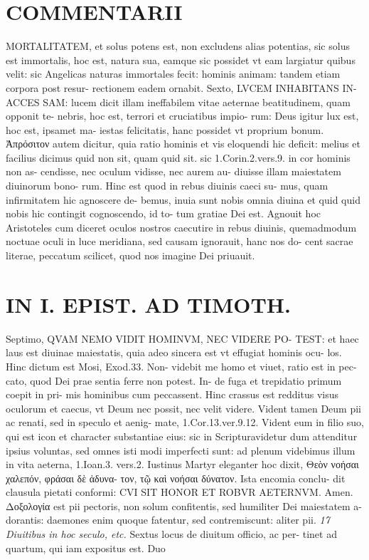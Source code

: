 \documentclass{article}
\begin{document}
\begin{pages}
\section*{COMMENTARII }
\marginpar{[ p.166 ]}\pstart MORTALITATEM, et solus potens est, non excludens alias potentias, sic solus est immortalis, hoc est, natura sua, eamque sic possidet vt eam largiatur quibus velit: sic Angelicas naturas immortales fecit: hominis animam: tandem etiam corpora post resur- rectionem eadem ornabit.  \pend\pstart Sexto, LVCEM INHABITANS IN- ACCES SAM: lucem dicit illam ineffabilem vitae aeternae beatitudinem, quam opponit te- nebris, hoc est, terrori et cruciatibus impio- rum: Deus igitur lux est, hoc est, ipsamet ma- iestas felicitatis, hanc possidet vt proprium bonum. Ἀπρόσιτον autem dicitur, quia ratio hominis et vis eloquendi hic deficit: melius et facilius dicimus quid non sit, quam quid sit. sic 1.Corin.2.vers.9. in cor hominis non as- cendisse, nec oculum vidisse, nec aurem au- diuisse illam maiestatem diuinorum bono- rum. Hinc est quod in rebus diuinis caeci su- mus, quam infirmitatem hic agnoscere de- bemus, inuia sunt nobis omnia diuina et quid quid nobis hic contingit cognoscendo, id to- tum gratiae Dei est. Agnouit hoc Aristoteles cum diceret oculos nostros caecutire in rebus diuinis, quemadmodum noctuae oculi in luce meridiana, sed causam ignorauit, hanc nos do- cent sacrae literae, peccatum scilicet, quod nos imagine Dei priuauit.  \pend
\section*{IN I. EPIST. AD TIMOTH. }
\marginpar{[ p.167 ]}\pstart Septimo, QVAM NEMO VIDIT HOMINVM, NEC VIDERE PO- TEST: et haec laus est diuinae maiestatis, quia adeo sincera est vt effugiat hominis ocu- los. Hinc dictum est Mosi, Exod.33. Non- videbit me homo et viuet, ratio est in pec- cato, quod Dei prae sentia ferre non potest. In- de fuga et trepidatio primum coepit in pri- mis hominibus cum peccassent. Hinc crassus est redditus visus oculorum et caecus, vt Deum nec possit, nec velit videre. Vident tamen Deum pii ac renati, sed in speculo et aenig- mate, 1.Cor.13.ver.9.12. Vident eum in filio suo, qui est icon et character substantiae eius: sic in Scripturavidetur dum attenditur ipsius voluntas, sed omnes isti modi imperfecti sunt: ad plenum videbimus illum in vita aeterna, 1.Ioan.3. vers.2. Iustinus Martyr eleganter hoc dixit, Θεὸν νοήσαι χαλεπόν, φράσαι δὲ ἀδυνα- τον, τῷ καὶ νοήσαι δύνατον. Ista encomia conclu- dit clausula pietati conformi: CVI SIT HONOR ET ROBVR AETERNVM. Amen. Δοξολογία est pii pectoris, non solum confitentis, sed humiliter Dei maiestatem a- dorantis: daemones enim quoque fatentur, sed contremiscunt: aliter pii.  \pend
\textit{17 Diuitibus in hoc seculo, etc. }\pstart Sextus locus de diuitum officio, ac per- tinet ad quartum, qui iam expositus est. Duo  \pend

\end{pages}
\end{document}
